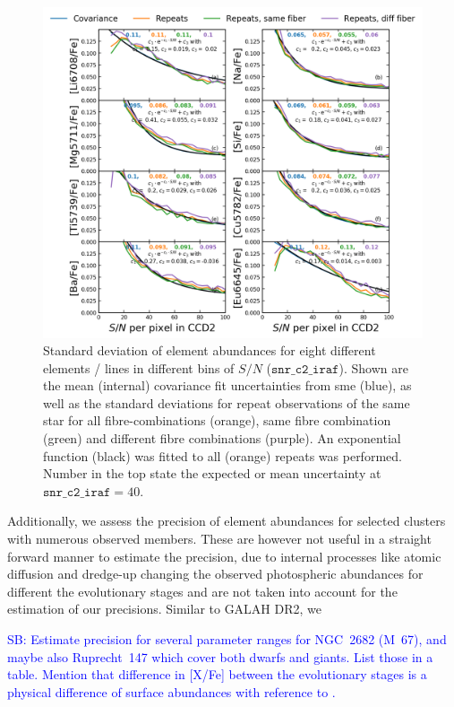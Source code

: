 \documentclass[fleqn,usenatbib,useAMS]{mnras}
\newcommand\SB[1]{\textcolor{blue}{SB: #1}}
\begin{document}
\begin{figure}
\centering
\includegraphics[width=\textwidth]{figures/repeat_uncertainties_abundance_selection.png}
\caption{Standard deviation of element abundances for eight different elements / lines in different bins of $S/N$ ($\texttt{snr\_c2\_iraf}$). Shown are the mean (internal) covariance fit uncertainties from {\sc sme} (blue), as well as the standard deviations for repeat observations of the same star for all fibre-combinations (orange), same fibre combination (green) and different fibre combinations (purple). An exponential function (black) was fitted to all (orange) repeats was performed. Number in the top state the expected or mean uncertainty at $\texttt{snr\_c2\_iraf} = 40$.}
\label{fig:repeat_uncertainties_abundance_selection}
\end{figure}

Additionally, we assess the precision of element abundances for selected clusters with numerous observed members. These are however not useful in a straight forward manner to estimate the precision, due to internal processes like atomic diffusion and dredge-up changing the observed photospheric abundances for different the evolutionary stages and are not taken into account for the estimation of our precisions. Similar to GALAH DR2, we 

\SB{Estimate precision for several parameter ranges for NGC~2682 (M~67), and maybe also Ruprecht~147 which cover both dwarfs and giants. List those in a table. Mention that difference in [X/Fe] between the evolutionary stages is a physical difference of surface abundances with reference to \citet{Gao2018, BertelliMotta2018, Souto2018, Souto2019}.}
\end{document}
